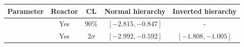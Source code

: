 \begin{tabular}{| c | c | c | c | c |}
\hline
Parameter & Reactor & CL & Normal hierarchy & Inverted hierarchy \\
\hline
\deltacp		& Yes & 90\% & $\left[ -2.815, -0.847 \right]$ & - \\
\deltacp		& Yes & $ 2\sigma $ & $\left[ -2.992, -0.592 \right]$ & $\left[ -1.808, -1.005 \right]$ \\
\hline
\end{tabular}
